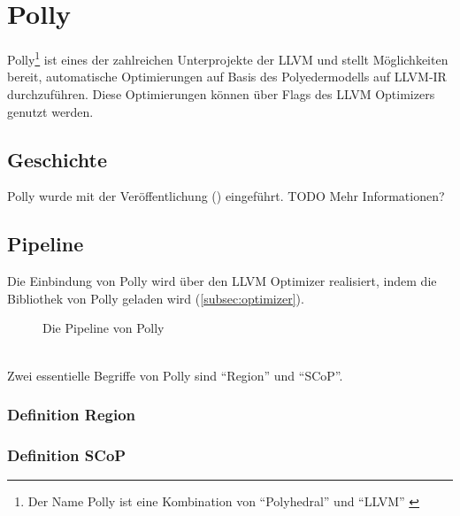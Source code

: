 \chapter{Polly}
Polly\footnote{Der Name Polly ist eine Kombination von \enquote{Polyhedral} und \enquote{\ac{LLVM}} \cite{PollyGrosser}} ist eines der zahlreichen Unterprojekte der \ac{LLVM} und stellt Möglichkeiten bereit, automatische Optimierungen auf Basis des Polyedermodells auf \ac{LLVM-IR} durchzuführen.
Diese Optimierungen können über Flags des \ac{LLVM} Optimizers genutzt werden.
\section{Geschichte}
Polly wurde mit der Veröffentlichung (\cite{PollyGrosser}) eingeführt. TODO Mehr Informationen?

\section{Pipeline \cite{PollyPresentation}}
Die Einbindung von Polly wird über den \ac{LLVM} Optimizer realisiert, indem die Bibliothek von Polly geladen wird (\autoref{subsec:optimizer}).
\begin{figure}[h]
    \caption{Die Pipeline von Polly}
    \centering
\end{figure}\\
Zwei essentielle Begriffe von Polly sind \enquote{Region} und \enquote{\ac{SCoP}}.
\subsection{Definition Region}

\subsection{Definition SCoP}
